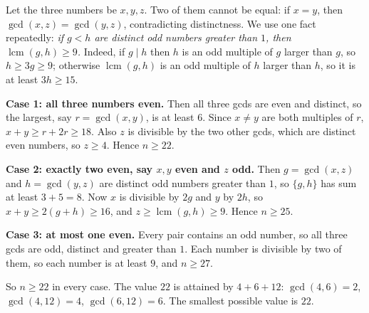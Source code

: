 Let the three numbers be $x,y,z$. Two of them cannot be equal: if $x=y$, then $\gcd(x,z)=\gcd(y,z)$, contradicting distinctness. We use one fact repeatedly: \emph{if $g<h$ are distinct odd numbers greater than $1$, then $\operatorname{lcm}(g,h)\ge9$.} Indeed, if $g\mid h$ then $h$ is an odd multiple of $g$ larger than $g$, so $h\ge3g\ge9$; otherwise $\operatorname{lcm}(g,h)$ is an odd multiple of $h$ larger than $h$, so it is at least $3h\ge15$.

\textbf{Case 1: all three numbers even.} Then all three gcds are even and distinct, so the largest, say $r=\gcd(x,y)$, is at least $6$. Since $x\ne y$ are both multiples of $r$, $x+y\ge r+2r\ge18$. Also $z$ is divisible by the two other gcds, which are distinct even numbers, so $z\ge4$. Hence $n\ge22$.

\textbf{Case 2: exactly two even, say $x,y$ even and $z$ odd.} Then $g=\gcd(x,z)$ and $h=\gcd(y,z)$ are distinct odd numbers greater than $1$, so $\{g,h\}$ has sum at least $3+5=8$. Now $x$ is divisible by $2g$ and $y$ by $2h$, so $x+y\ge2(g+h)\ge16$, and $z\ge\operatorname{lcm}(g,h)\ge9$. Hence $n\ge25$.

\textbf{Case 3: at most one even.} Every pair contains an odd number, so all three gcds are odd, distinct and greater than $1$. Each number is divisible by two of them, so each number is at least $9$, and $n\ge27$.

So $n\ge22$ in every case. The value $22$ is attained by $4+6+12$: $\gcd(4,6)=2$, $\gcd(4,12)=4$, $\gcd(6,12)=6$. The smallest possible value is $\boxed{22}$.
